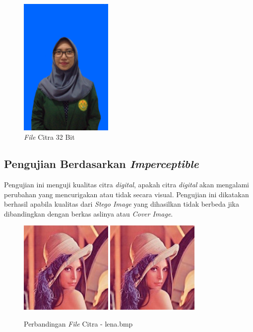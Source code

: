 	\begin{figure}[H]
		\centering
		\includegraphics[width=0.4\textwidth]{gambar/matlab/amelia}
		\caption{\emph{File} Citra 32 Bit}
		\label{amelia32}
	\end{figure}

	\subsection{Pengujian Berdasarkan \emph{Imperceptible}}
	Pengujian ini menguji kualitas citra \emph{digital}, apakah citra \emph{digital} akan mengalami perubahan yang mencurigakan atau tidak secara visual. Pengujian ini dikatakan berhasil apabila kualitas dari \emph{Stego Image} yang dihasilkan tidak berbeda jika dibandingkan dengan berkas aslinya atau \emph{Cover Image}.

	\begin{figure}[H]
		\centering
		\includegraphics[width=0.4\textwidth]{gambar/matlab/lena}
		\includegraphics[width=0.4\textwidth]{gambar/matlab/lena_kalimat}
		\caption{Perbandingan \emph{File} Citra - lena.bmp}
		\label{lena_stego}
	\end{figure}

